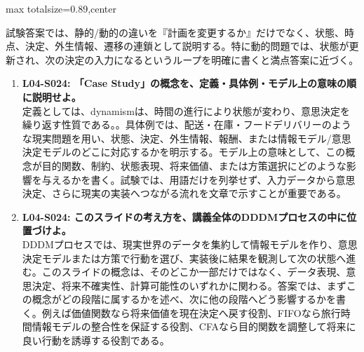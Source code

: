 \begin{minipage}[t]{0.58\textwidth}
\begin{adjustbox}{max totalsize={\textwidth}{0.89\textheight},center}
\begin{minipage}{\textwidth}
試験答案では、静的/動的の違いを『計画を変更するか』だけでなく、状態、時点、決定、外生情報、遷移の連鎖として説明する。特に動的問題では、状態が更新され、次の決定の入力になるというループを明確に書くと満点答案に近づく。\par{}\begin{enumerate}\item \textbf{L04-S024: 「Case Study」の概念を、定義・具体例・モデル上の意味の順に説明せよ。}\\定義としては、dynamismは、時間の進行により状態が変わり、意思決定を繰り返す性質である。。具体例では、配送・在庫・フードデリバリーのような現実問題を用い、状態、決定、外生情報、報酬、または情報モデル/意思決定モデルのどこに対応するかを明示する。モデル上の意味として、この概念が目的関数、制約、状態表現、将来価値、または方策選択にどのような影響を与えるかを書く。試験では、用語だけを列挙せず、入力データから意思決定、さらに現実の実装へつながる流れを文章で示すことが重要である。\item \textbf{L04-S024: このスライドの考え方を、講義全体のDDDMプロセスの中に位置づけよ。}\\DDDMプロセスでは、現実世界のデータを集約して情報モデルを作り、意思決定モデルまたは方策で行動を選び、実装後に結果を観測して次の状態へ進む。このスライドの概念は、そのどこか一部だけではなく、データ表現、意思決定、将来不確実性、計算可能性のいずれかに関わる。答案では、まずこの概念がどの段階に属するかを述べ、次に他の段階へどう影響するかを書く。例えば価値関数なら将来価値を現在決定へ戻す役割、FIFOなら旅行時間情報モデルの整合性を保証する役割、CFAなら目的関数を調整して将来に良い行動を誘導する役割である。\end{enumerate}
\end{minipage}
\end{adjustbox}
\end{minipage}


